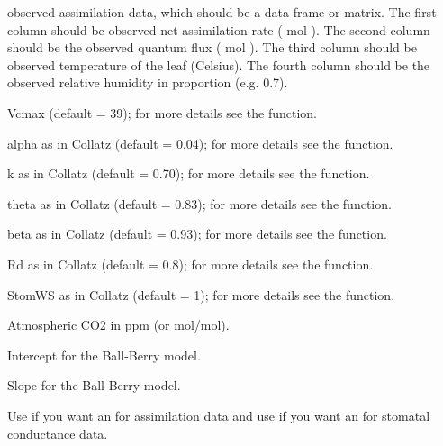 \documentclass[letterpaper]{book}
\begin{document}
\begin{Arguments}
\begin{ldescription}
\item[\code{data}] observed assimilation data, which should be a
data frame or matrix.  The first column should be
observed net assimilation rate (\eqn{\mu}{} mol
 ).  The second column should be
the observed quantum flux (\eqn{\mu}{} mol 
).  The third column should be observed
temperature of the leaf (Celsius).  The fourth column
should be the observed relative humidity in proportion
(e.g. 0.7).

\item[\code{vmax}] Vcmax (default = 39); for more details see
the  function.

\item[\code{alph}] alpha as in Collatz (default = 0.04); for
more details see the  function.

\item[\code{kparm}] k as in Collatz (default = 0.70); for more
details see the  function.

\item[\code{theta}] theta as in Collatz (default = 0.83); for
more details see the  function.

\item[\code{beta}] beta as in Collatz (default = 0.93); for more
details see the  function.

\item[\code{Rd}] Rd as in Collatz (default = 0.8); for more
details see the  function.

\item[\code{StomWS}] StomWS as in Collatz (default = 1); for
more details see the  function.

\item[\code{Catm}] Atmospheric CO2 in ppm (or
\eqn{\mu}{}mol/mol).

\item[\code{b0}] Intercept for the Ball-Berry model.

\item[\code{b1}] Slope for the Ball-Berry model.

\item[\code{response}] Use  if you want an
 for assimilation data and use 
if you want an  for stomatal conductance data.
\end{ldescription}
\end{Arguments}
\end{document}
